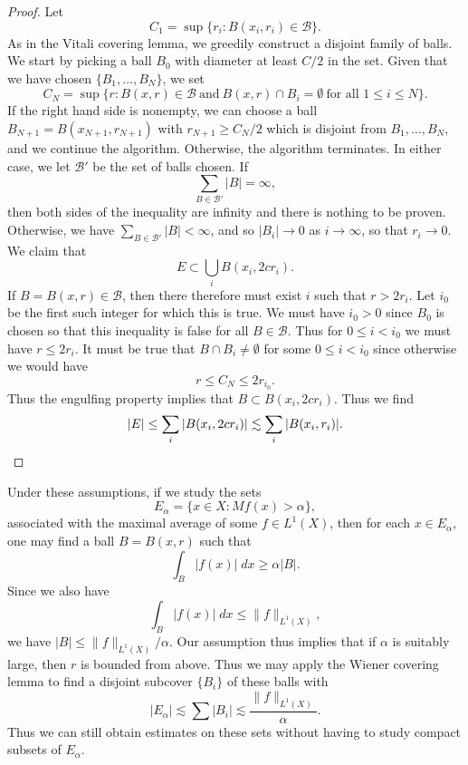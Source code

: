 \begin{proof}
    Let
    \[ C_1 = \sup \{ r_i : B(x_i,r_i) \in \mathcal{B} \}. \]
    As in the Vitali covering lemma, we greedily construct a disjoint family of balls. We start by picking a ball $B_0$ with diameter at least $C/2$ in the set. Given that we have chosen $\{ B_1,\dots, B_N \}$, we set
    \[ C_N = \sup \{ r : B(x,r) \in \mathcal{B}\ \text{and}\ B(x,r) \cap B_i = \emptyset\ \text{for all $1 \leq i \leq N$} \}. \]
    If the right hand side is nonempty, we can choose a ball $B_{N+1} = B(x_{N+1}, r_{N+1})$ with $r_{N+1} \geq C_N/2$ which is disjoint from $B_1,\dots,B_N$, and we continue the algorithm. Otherwise, the algorithm terminates. In either case, we let $\mathcal{B}'$ be the set of balls chosen. If
    \[ \sum_{B \in \mathcal{B}'} |B| = \infty, \]
    then both sides of the inequality are infinity and there is nothing to be proven. Otherwise, we have $\sum_{B \in \mathcal{B}'} |B| < \infty$, and so $|B_i| \to 0$ as $i \to \infty$, so that $r_i \to 0$. We claim that
    \[ E \subset \bigcup_i B(x_i, 2c r_i). \]
    If $B = B(x,r) \in \mathcal{B}$, then there therefore must exist $i$ such that $r > 2 r_i$. Let $i_0$ be the first such integer for which this is true. We must have $i_0 > 0$ since $B_0$ is chosen so that this inequality is false for all $B \in \mathcal{B}$. Thus for $0 \leq i < i_0$ we must have $r \leq 2 r_i$. It must be true that $B \cap B_i \neq \emptyset$ for some $0 \leq i < i_0$ since otherwise we would have
    \[ r \leq C_N \leq 2 r_{i_0}. \]
    Thus the engulfing property implies that $B \subset B(x_i, 2c r_i)$. Thus we find
    \[ |E| \leq \sum_i |B(x_i, 2c r_i)| \lesssim \sum_i |B(x_i, r_i)|. \qedhere \]
\end{proof}

Under these assumptions, if we study the sets
%
\[ E_\alpha = \{ x \in X : Mf(x) > \alpha \}, \]
%
associated with the maximal average of some $f \in L^1(X)$, then for each $x \in E_\alpha$, one may find a ball $B = B(x,r)$ such that
%
\[ \int_{B} |f(x)|\; dx \geq \alpha |B|. \]
%
Since we also have
%
\[ \int_B |f(x)|\; dx \leq \| f \|_{L^1(X)}, \]
%
we have $|B| \leq \| f \|_{L^1(X)} / \alpha$. Our assumption thus implies that if $\alpha$ is suitably large, then $r$ is bounded from above. Thus we may apply the Wiener covering lemma to find a disjoint subcover $\{ B_i \}$ of these balls with
%
\[ |E_\alpha| \lesssim \sum |B_i| \lesssim \frac{\| f \|_{L^1(X)}}{\alpha}. \]
%
Thus we can still obtain estimates on these sets without having to study compact subsets of $E_\alpha$.

